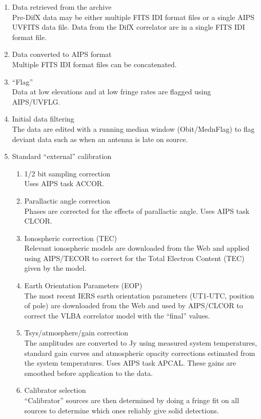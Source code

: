 \documentclass[11pt]{article}
\begin{document}
\begin{enumerate}
\item Data retrieved from the archive\\
Pre-DifX data may be either multiple FITS IDI format files or a single
AIPS UVFITS data file.
Data from the DifX correlator are in a single FITS IDI format file.
\item Data converted to AIPS format\\
Multiple  FITS IDI format files can be concatenated.
\item ``Flag''\\
Data at low elevations and at low fringe rates are flagged using AIPS/UVFLG.
\item Initial data filtering \\
The data are edited with a running median window (Obit/MednFlag) to
flag deviant data such as when an antenna is late on source.
\item Standard ``external'' calibration
\begin {enumerate}
\item 1/2 bit sampling correction\\
Uses AIPS task ACCOR.
\item Parallactic angle correction\\
Phases are corrected for the effects of parallactic angle.
Uses AIPS task CLCOR.
\item Ionospheric correction (TEC)\\
Relevant ionospheric models are downloaded from the Web and applied
using AIPS/TECOR to correct for the Total Electron Content (TEC) given
by the model.
\item Earth Orientation Parameters (EOP) \\
The most recent IERS earth orientation parameters (UT1-UTC, position of
pole) are downloaded from the Web and used by AIPS/CLCOR to correct
the VLBA correlator model with the ``final'' values.
\item Tsys/atmosphere/gain correction\\
The amplitudes are converted to Jy using measured system temperatures,
standard gain curves and atmospheric opacity corrections estimated
from the system temperatures.
Uses AIPS task APCAL.
These gains are smoothed before application to the data.
\item Calibrator selection\\
``Calibrator'' sources are then determined by doing a fringe fit on
all sources to determine which ones reliably give solid detections.

\end{enumerate}
\end{enumerate}
\end{document}
